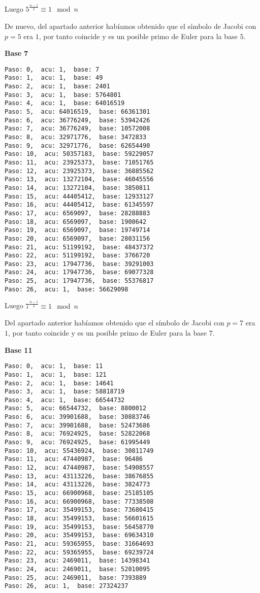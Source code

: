\documentclass[a4paper]{article}
\begin{document}
Luego $5^{\frac{n-1}{2}}\equiv 1\mod n$

De nuevo, del apartado anterior habíamos obtenido que el símbolo de Jacobi con $p=5$ era $1$, por tanto coincide y es un posible primo de Euler para la base $5$.

\textbf{Base 7}
\begin{verbatim}
Paso: 0,  acu: 1,  base: 7  
Paso: 1,  acu: 1,  base: 49  
Paso: 2,  acu: 1,  base: 2401  
Paso: 3,  acu: 1,  base: 5764801  
Paso: 4,  acu: 1,  base: 64016519  
Paso: 5,  acu: 64016519,  base: 66361301  
Paso: 6,  acu: 36776249,  base: 53942426  
Paso: 7,  acu: 36776249,  base: 10572008  
Paso: 8,  acu: 32971776,  base: 3472833  
Paso: 9,  acu: 32971776,  base: 62654490  
Paso: 10,  acu: 50357183,  base: 59229057  
Paso: 11,  acu: 23925373,  base: 71051765  
Paso: 12,  acu: 23925373,  base: 36885562  
Paso: 13,  acu: 13272104,  base: 46045556  
Paso: 14,  acu: 13272104,  base: 3850811  
Paso: 15,  acu: 44405412,  base: 12933127  
Paso: 16,  acu: 44405412,  base: 61345597  
Paso: 17,  acu: 6569097,  base: 28288883  
Paso: 18,  acu: 6569097,  base: 1900642  
Paso: 19,  acu: 6569097,  base: 19749714  
Paso: 20,  acu: 6569097,  base: 28031156  
Paso: 21,  acu: 51199192,  base: 48437372  
Paso: 22,  acu: 51199192,  base: 3766720  
Paso: 23,  acu: 17947736,  base: 39291003  
Paso: 24,  acu: 17947736,  base: 69077328  
Paso: 25,  acu: 17947736,  base: 55376817  
Paso: 26,  acu: 1,  base: 56629098  
\end{verbatim}

Luego $7^{\frac{n-1}{2}}\equiv 1\mod n$

Del apartado anterior habíamos obtenido que el símbolo de Jacobi con $p=7$ era $1$, por tanto coincide y es un posible primo de Euler para la base $7$.

\textbf{Base 11}
\begin{verbatim}
Paso: 0,  acu: 1,  base: 11  
Paso: 1,  acu: 1,  base: 121  
Paso: 2,  acu: 1,  base: 14641  
Paso: 3,  acu: 1,  base: 58818719  
Paso: 4,  acu: 1,  base: 66544732  
Paso: 5,  acu: 66544732,  base: 8800012  
Paso: 6,  acu: 39901688,  base: 30883746  
Paso: 7,  acu: 39901688,  base: 52473686  
Paso: 8,  acu: 76924925,  base: 52822068  
Paso: 9,  acu: 76924925,  base: 61995449  
Paso: 10,  acu: 55436924,  base: 30811749  
Paso: 11,  acu: 47440987,  base: 96486  
Paso: 12,  acu: 47440987,  base: 54908557  
Paso: 13,  acu: 43113226,  base: 38676855  
Paso: 14,  acu: 43113226,  base: 3824773  
Paso: 15,  acu: 66900968,  base: 25185105  
Paso: 16,  acu: 66900968,  base: 77338508  
Paso: 17,  acu: 35499153,  base: 73680415  
Paso: 18,  acu: 35499153,  base: 56601615  
Paso: 19,  acu: 35499153,  base: 56458770  
Paso: 20,  acu: 35499153,  base: 69634310  
Paso: 21,  acu: 59365955,  base: 31664693  
Paso: 22,  acu: 59365955,  base: 69239724  
Paso: 23,  acu: 2469011,  base: 14398341  
Paso: 24,  acu: 2469011,  base: 52010095  
Paso: 25,  acu: 2469011,  base: 7393889  
Paso: 26,  acu: 1,  base: 27324237 
\end{verbatim}
\end{document}
